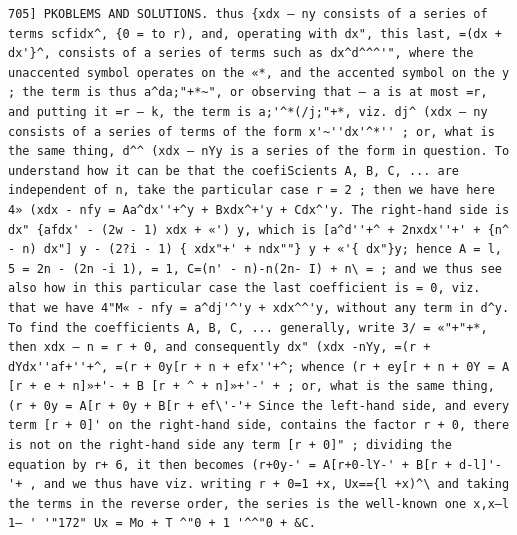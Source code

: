 \documentclass[11pt,a4paper]{book}
\begin{document}
\newpage
\setcounter{page}{591}
\begin{verbatim}
705] PKOBLEMS AND SOLUTIONS. thus {xdx — ny consists of a series of terms scfidx^, {0 = to r), and, operating with dx", this last, =(dx + dx'}^, consists of a series of terms such as dx^d^^^'", where the unaccented symbol operates on the «*, and the accented symbol on the y ; the term is thus a^da;"+*~", or observing that — a is at most =r, and putting it =r — k, the term is a;'^*(/j;"+*, viz. dj^ (xdx — ny consists of a series of terms of the form x'~''dx'^*'' ; or, what is the same thing, d^^ (xdx — nYy is a series of the form in question. To understand how it can be that the coefiScients A, B, C, ... are independent of n, take the particular case r = 2 ; then we have here 4» (xdx - nfy = Aa^dx''+^y + Bxdx^+'y + Cdx^'y. The right-hand side is dx" {afdx' - (2w - 1) xdx + «') y, which is [a^d''+^ + 2nxdx''+' + {n^ - n) dx"] y - (2?i - 1) { xdx"+' + ndx""} y + «'{ dx"}y; hence A = l, 5 = 2n - (2n -i 1), = 1, C=(n' - n)-n(2n- I) + n\ = ; and we thus see also how in this particular case the last coefficient is = 0, viz. that we have 4"M« - nfy = a^dj'^'y + xdx^^'y, without any term in d^y. To find the coefficients A, B, C, ... generally, write 3/ = «"+"+*, then xdx — n = r + 0, and consequently dx" (xdx -nYy, =(r + dYdx''af+''+^, =(r + 0y[r + n + efx''+^; whence (r + ey[r + n + 0Y = A [r + e + n]»+'- + B [r + ^ + n]»+'-' + ; or, what is the same thing, (r + 0y = A[r + 0y + B[r + ef\'-'+ Since the left-hand side, and every term [r + 0]' on the right-hand side, contains the factor r + 0, there is not on the right-hand side any term [r + 0]" ; dividing the equation by r+ 6, it then becomes (r+0y-' = A[r+0-lY-' + B[r + d-l]'-'+ , and we thus have viz. writing r + 0=1 +x, Ux=={l +x)^\ and taking the terms in the reverse order, the series is the well-known one x,x—l 1— ' '"172" Ux = Mo + T ^"0 + 1 '^^"0 + &C. 
\end{verbatim}
\end{document}
